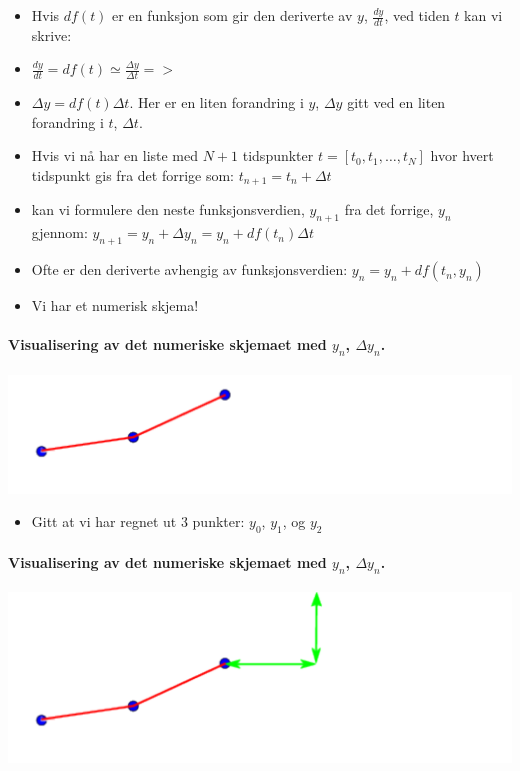 \documentclass[%
oneside,                 %
final,                   %
10pt]{article}
\begin{document}
\noindent
\begin{itemize}
\item Hvis $df(t)$ er en funksjon som gir den deriverte av $y$, $\frac{dy}{dt}$, ved tiden $t$ kan vi skrive:

\item $\frac{dy}{dt}=df(t)\simeq \frac{\Delta y}{\Delta t}=>$

\item $\Delta y = df(t) \Delta t$. Her er en liten forandring i $y$, $\Delta y$ gitt ved en liten forandring i $t$, $\Delta t$.

\item Hvis vi nå har en liste med $N+1$ tidspunkter $t=[t_0, t_1, \ldots, t_N]$ hvor hvert tidspunkt gis fra det forrige som: $t_{n+1}=t_n+\Delta t$

\item kan vi formulere den neste funksjonsverdien, $y_{n+1}$ fra det forrige, $y_{n}$ gjennom: $y_{n+1}=y_n+\Delta y_n=y_n+df(t_n) \Delta t$

\item Ofte er den deriverte avhengig av funksjonsverdien: $y_n=y_n+df(t_n, y_n)$

\item Vi har et numerisk skjema!
\end{itemize}

\noindent


\paragraph{Visualisering av det numeriske skjemaet med $y_n$, $\Delta y_n$.}
\centerline{\includegraphics[width=0.9\linewidth]{fig/diskret_funksjon_0.pdf}}



\begin{itemize}
\item Gitt at vi har regnet ut 3 punkter: $y_0$, $y_1$, og $y_2$
\end{itemize}

\noindent
\paragraph{Visualisering av det numeriske skjemaet med $y_n$, $\Delta y_n$.}
\centerline{\includegraphics[width=0.9\linewidth]{fig/diskret_funksjon_1.pdf}}
\end{document}
